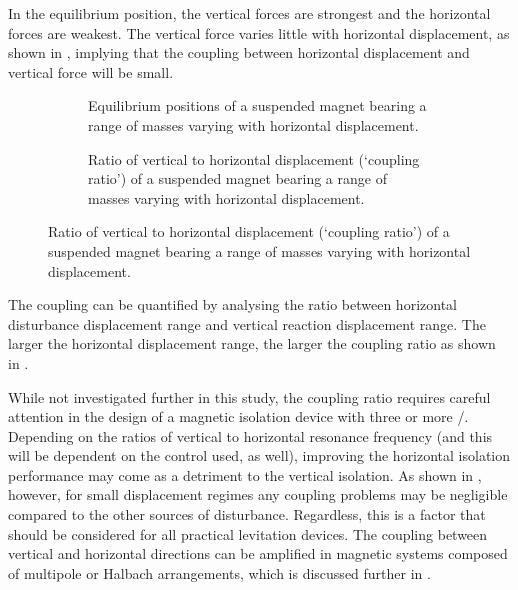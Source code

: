 \documentclass[11pt,a4paper]{memoir}
\begin{document}
In the equilibrium position, the vertical forces are strongest and the
horizontal forces are weakest. The vertical force varies little with
horizontal displacement, as shown in , implying
that the coupling between horizontal displacement and vertical force will be
small.

\begin{figure}
\begin{wide}
  \begin{subfigure}
  \caption{Equilibrium positions of a suspended magnet bearing a range of
  masses varying with horizontal displacement.}
  \end{subfigure}\hfil
  \begin{subfigure}
  \caption{Ratio of vertical to horizontal displacement (`coupling ratio') of
  a suspended magnet bearing a range of masses varying with horizontal
  displacement.}
  \end{subfigure}
\end{wide}
\end{figure}

The coupling can be quantified by analysing the ratio between horizontal
disturbance displacement range and vertical reaction displacement range. The
larger the horizontal displacement range, the larger the coupling ratio as
shown in .

While not investigated further in this study, the coupling ratio requires careful attention in the design of a magnetic isolation device with three or more \dofs/.
Depending on the ratios of vertical to horizontal resonance frequency (and this will be dependent on the control used, as well), improving the horizontal isolation performance may come as a detriment to the vertical isolation.
As shown in , however, for small displacement regimes any coupling problems may be negligible compared to the other sources of disturbance.
Regardless, this is a factor that should be considered for all practical levitation devices.
The coupling between vertical and horizontal directions can be amplified in magnetic systems composed of multipole or Halbach arrangements, which is discussed further in .
\end{document}
